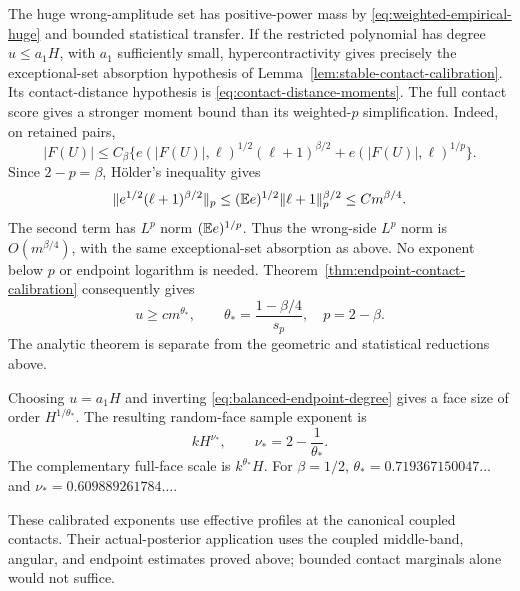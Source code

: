 The huge wrong-amplitude set has positive-power mass by
\eqref{eq:weighted-empirical-huge} and bounded statistical transfer.
If the restricted polynomial has degree $u\le a_1H$, with $a_1$
sufficiently small, hypercontractivity gives precisely the exceptional-set
absorption hypothesis of Lemma~\ref{lem:stable-contact-calibration}.
Its contact-distance hypothesis is
\eqref{eq:contact-distance-moments}. The full contact score gives a stronger moment bound than its
weighted-$p$ simplification. Indeed, on retained pairs,
\[
 |F(U)|\le C_\beta\big\{
 e(|F(U)|,\ell)^{1/2}(\ell+1)^{\beta/2}
       +e(|F(U)|,\ell)^{1/p}\big\}.
\]
Since $2-p=\beta$, H\"older's inequality gives
\[
 \|e^{1/2}(\ell+1)^{\beta/2}\|_p
 \le (\mathbb E e)^{1/2}\|\ell+1\|_p^{\beta/2}
 \le C m^{\beta/4}.
\]
The second term has $L^p$ norm $(\mathbb E e)^{1/p}$. Thus the wrong-side
$L^p$ norm is $O(m^{\beta/4})$, with the same exceptional-set absorption
as above. No exponent below $p$ or endpoint logarithm is needed.
Theorem~\ref{thm:endpoint-contact-calibration} consequently gives
\begin{equation}\label{eq:balanced-endpoint-degree}
 u\ge c m^{\theta_*},\qquad
 \theta_* =\frac{1-\beta/4}{s_p},\quad p=2-\beta.
\end{equation}
The analytic theorem is separate from the geometric and statistical
reductions above.

Choosing $u=a_1H$ and inverting
\eqref{eq:balanced-endpoint-degree} gives a face size of order
$H^{1/\theta_*}$. The resulting random-face sample exponent is
\begin{equation}\label{eq:balanced-sample-scale}
 kH^{\nu_*},\qquad \nu_*=2-\frac1{\theta_*}.
\end{equation}
The complementary full-face scale is $k^{\theta_*}H$.
For $\beta=1/2$, $\theta_*=0.719367150047\ldots$ and
$\nu_*=0.609889261784\ldots$.

These calibrated exponents use effective profiles at the canonical
coupled contacts. Their actual-posterior application uses the coupled
middle-band, angular, and endpoint estimates proved above; bounded
contact marginals alone would not suffice.
